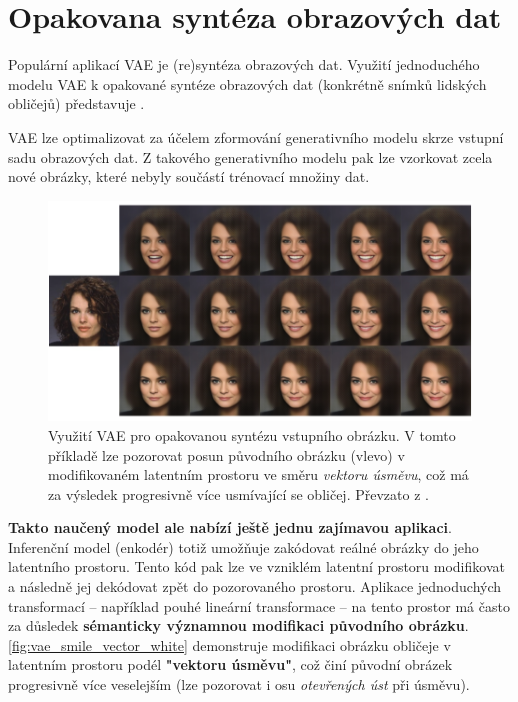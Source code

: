 \newpage
\section{Opakovana syntéza obrazových dat}
\label{sec:applications_image_resynthesis}
Populární aplikací VAE je (re)syntéza obrazových dat.
Využití jednoduchého modelu VAE k opakované syntéze obrazových dat (konkrétně snímků lidských obličejů) představuje \cite{White2016}.

VAE lze optimalizovat za účelem zformování generativního modelu skrze vstupní sadu obrazových dat.
Z takového generativního modelu pak lze vzorkovat zcela nové obrázky, které nebyly součástí trénovací množiny dat. \cite{Kingma2019}

\begin{figure}[H]
    \centering
    \includegraphics[width=\textwidth]{figures/applications/vae_smile_vector_white.png}
    \caption{Využití VAE pro opakovanou syntézu vstupního obrázku. V tomto příkladě lze pozorovat posun původního obrázku (vlevo) v modifikovaném latentním prostoru ve směru \emph{vektoru úsměvu}, což má za výsledek progresivně více usmívající se obličej. Převzato z \cite{White2016}.}
    \label{fig:vae_smile_vector_white}
\end{figure}


\textbf{Takto naučený model ale nabízí ještě jednu zajímavou aplikaci}.
Inferenční model (enkodér) totiž umožňuje zakódovat reálné obrázky do jeho latentního prostoru.
Tento kód pak lze ve vzniklém latentní prostoru modifikovat a následně jej dekódovat zpět do pozorovaného prostoru.
Aplikace jednoduchých transformací – například pouhé lineární transformace – na tento prostor má často za důsledek \textbf{sémanticky významnou modifikaci původního obrázku}.
\autoref{fig:vae_smile_vector_white} demonstruje modifikaci obrázku obličeje v latentním prostoru podél \textbf{"vektoru úsměvu"}, což činí původní obrázek progresivně více veselejším (lze pozorovat i osu \emph{otevřených úst} při úsměvu). \cite{Kingma2019}

